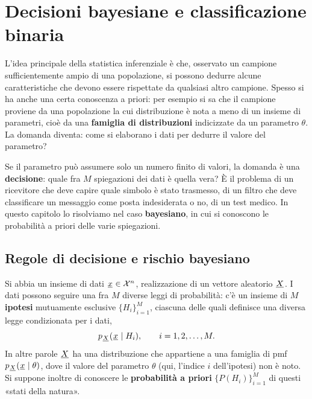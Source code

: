 \chapter{Decisioni bayesiane e classificazione binaria}

L'idea principale della statistica inferenziale è che, osservato un campione sufficientemente ampio di una popolazione,
si possono dedurre alcune caratteristiche che devono essere rispettate da qualsiasi altro campione. Spesso si ha anche
una certa conoscenza a priori: per esempio si sa che il campione proviene da una popolazione la cui distribuzione è nota
a meno di un insieme di parametri, cioè da una \textbf{famiglia di distribuzioni} indicizzate da un parametro $\theta$.
La domanda diventa: come si elaborano i dati per dedurre il valore del parametro?

Se il parametro può assumere solo un numero finito di valori, la domanda è una \textbf{decisione}: quale fra $M$
spiegazioni dei dati è quella vera? È il problema di un ricevitore che deve capire quale simbolo è stato trasmesso, di
un filtro che deve classificare un messaggio come posta indesiderata o no, di un test medico. In questo capitolo lo
risolviamo nel caso \textbf{bayesiano}, in cui si conoscono le probabilità a priori delle varie spiegazioni.

\section{Regole di decisione e rischio bayesiano}

Si abbia un insieme di dati ${\mkern1mu\underline{x}\mkern1mu} \in \mathcal{X}^n$, realizzazione di un vettore aleatorio ${\mkern1mu\underline{X}\mkern1mu}$. I dati
possono seguire una fra $M$ diverse leggi di probabilità: c'è un insieme di $M$ \textbf{ipotesi} mutuamente esclusive
$\{H_i\}_{i=1}^{M}$, ciascuna delle quali definisce una diversa legge condizionata per i dati,
\[ p_{{\mkern1mu\underline{X}\mkern1mu}}({\mkern1mu\underline{x}\mkern1mu} \mid H_i) , \qquad i = 1, 2, \ldots, M . \]
In altre parole ${\mkern1mu\underline{X}\mkern1mu}$ ha una distribuzione che appartiene a una famiglia di pmf $p_{{\mkern1mu\underline{X}\mkern1mu}}({\mkern1mu\underline{x}\mkern1mu} \mid
\theta)$, dove il valore del parametro $\theta$ (qui, l'indice $i$ dell'ipotesi) non è noto. Si suppone inoltre di
conoscere le \textbf{probabilità a priori} $\{P(H_i)\}_{i=1}^{M}$ di questi «stati della natura».


